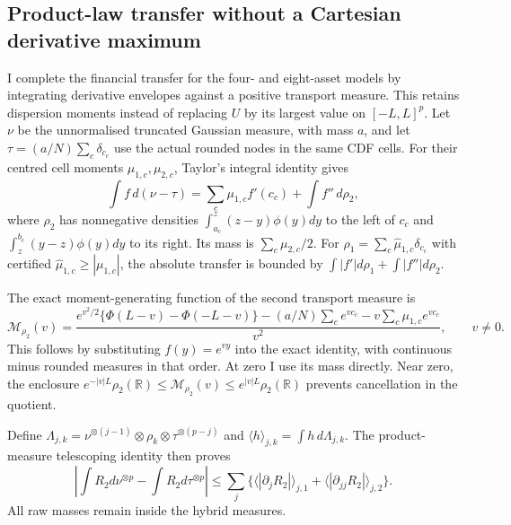 \subsection{Product-law transfer without a Cartesian derivative maximum}
\label{sec:positive-tensor-transfer}

I complete the financial transfer for the four- and eight-asset models
by integrating derivative envelopes against a positive transport measure.
This retains dispersion moments instead of replacing $U$ by its largest
value on $[-L,L]^p$. Let $\nu$ be the unnormalised truncated Gaussian
measure, with mass $a$, and let $\tau=(a/N)\sum_c\delta_{c_c}$ use the
actual rounded nodes in the same CDF cells. For their centred cell moments
$\mu_{1,c},\mu_{2,c}$, Taylor's integral identity gives
\[
 \int f\,d(\nu-\tau)=\sum_c\mu_{1,c}f'(c_c)
                         +\int f''\,d\rho_2,
\]
where $\rho_2$ has nonnegative densities
$\int_{a_c}^{z}(z-y)\phi(y)dy$ to the left of $c_c$ and
$\int_z^{b_c}(y-z)\phi(y)dy$ to its right. Its mass is
$\sum_c\mu_{2,c}/2$. For
$\rho_1=\sum_c\widehat\mu_{1,c}\delta_{c_c}$ with certified
$\widehat\mu_{1,c}\geq|\mu_{1,c}|$, the absolute transfer is bounded
by $\int|f'|d\rho_1+\int|f''|d\rho_2$.

The exact moment-generating function of the second transport measure is
\begin{equation}
 \mathcal M_{\rho_2}(v)=\frac{
 e^{v^2/2}\{\Phi(L-v)-\Phi(-L-v)\}
 -(a/N)\sum_c e^{vc_c}-v\sum_c\mu_{1,c}e^{vc_c}}{v^2},
 \qquad v\ne0.
 \label{eq:positive-transport-mgf}
\end{equation}
This follows by substituting $f(y)=e^{vy}$ into the exact identity,
with continuous minus rounded measures in that order. At zero I use its
mass directly. Near zero, the enclosure
$e^{-|v|L}\rho_2(\mathbb R)\leq\mathcal M_{\rho_2}(v)
\leq e^{|v|L}\rho_2(\mathbb R)$ prevents cancellation in the quotient.

Define
$\Lambda_{j,k}=\nu^{\otimes(j-1)}\otimes\rho_k
\otimes\tau^{\otimes(p-j)}$ and
$\langle h\rangle_{j,k}=\int h\,d\Lambda_{j,k}$.
The product-measure telescoping identity then proves
\begin{equation}
 \left|\int R_2d\nu^{\otimes p}-\int R_2d\tau^{\otimes p}\right|
 \leq\sum_j\{\langle|\partial_jR_2|\rangle_{j,1}
                   +\langle|\partial_{jj}R_2|\rangle_{j,2}\}.
 \label{eq:positive-tensor-transfer}
\end{equation}
All raw masses remain inside the hybrid measures.

